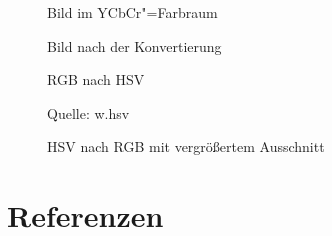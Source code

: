 \documentclass[a4paper,12pt,abstracton,titlepage]{scrartcl}
\begin{document}
 


\begin{figure}[htbp]
\begin{minipage}[t]{0.48\textwidth}
  \begin{center}
    \caption{Bild im YCbCr"=Farbraum}
    \label{ycbcr}
  \end{center}
\end{minipage}
\begin{minipage}[t]{0.52\textwidth}
  \begin{center}
    \caption{Bild nach der Konvertierung}
    \label{ycbcr2rgb}
  \end{center}
\end{minipage}
\end{figure}


\newpage
\begin{figure}[htbp]
\begin{minipage}[t]{0.48\textwidth}
  \begin{center}
    \caption{RGB nach HSV}
    \label{errorBall}
    \begin{small}
    Quelle: w.hsv
    \end{small}
  \end{center}
\end{minipage}
\begin{minipage}[t]{0.48\textwidth}
  \begin{center}
    \caption{HSV nach RGB mit vergrößertem Ausschnitt}
    \label{errorBallRGB}
  \end{center}
\end{minipage}
\end{figure}



\section{Referenzen}
\nocite{*} 
\end{document}
